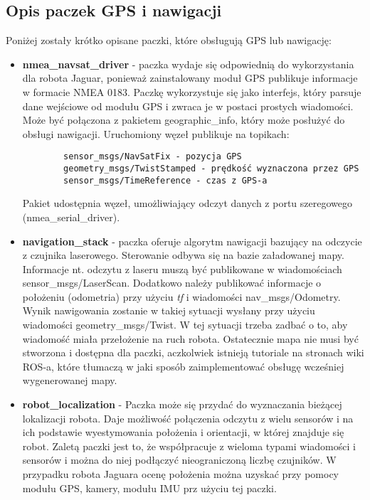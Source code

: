 \subsection{Opis paczek GPS i nawigacji}
Poniżej zostały krótko opisane paczki, które obsługują GPS lub nawigację:
\begin{itemize}
\item \textbf{nmea\_navsat\_driver} - paczka wydaje się odpowiednią do wykorzystania dla robota Jaguar, ponieważ zainstalowany moduł GPS publikuje informacje w formacie NMEA 0183. Paczkę wykorzystuje się jako interfejs, który parsuje dane wejściowe od modułu GPS i zwraca je w postaci prostych wiadomości. Może być połączona z pakietem geographic\_info, który może posłużyć do obsługi nawigacji. Uruchomiony węzeł publikuje na topikach:
	\begin{verbatim}
		sensor_msgs/NavSatFix - pozycja GPS
		geometry_msgs/TwistStamped - prędkość wyznaczona przez GPS
		sensor_msgs/TimeReference - czas z GPS-a
	\end{verbatim}
Pakiet udostępnia węzeł, umożliwiający odczyt danych z portu szeregowego (nmea\_serial\_driver).

\item \textbf{navigation\_stack} - paczka oferuje algorytm nawigacji bazujący na odczycie z czujnika laserowego. Sterowanie odbywa się na bazie załadowanej mapy. Informacje nt. odczytu z laseru muszą być publikowane w wiadomościach sensor\_msgs/LaserScan. Dodatkowo należy publikować informacje o położeniu (odometria) przy użyciu \textit{tf} i wiadomości nav\_msgs/Odometry. Wynik nawigowania zostanie w takiej sytuacji wysłany przy użyciu wiadomości geometry\_msgs/Twist. W tej sytuacji trzeba zadbać o to, aby wiadomość miała przełożenie na ruch robota. Ostatecznie mapa nie musi być stworzona i dostępna dla paczki, aczkolwiek istnieją tutoriale na stronach wiki ROS-a, które tłumaczą w jaki sposób zaimplementować obsługę wcześniej wygenerowanej mapy.   
\item \textbf{robot\_localization} - Paczka może się przydać do wyznaczania bieżącej lokalizacji robota. Daje możliwość połączenia odczytu z wielu sensorów i na ich podstawie wyestymowania położenia i orientacji, w której znajduje się robot. Zaletą paczki jest to, że współpracuje z wieloma typami wiadomości i sensorów i można do niej podłączyć nieograniczoną liczbę czujników. W przypadku robota Jaguara ocenę położenia można uzyskać przy pomocy modułu GPS, kamery, modułu IMU prz użyciu tej paczki. 
\end{itemize}
